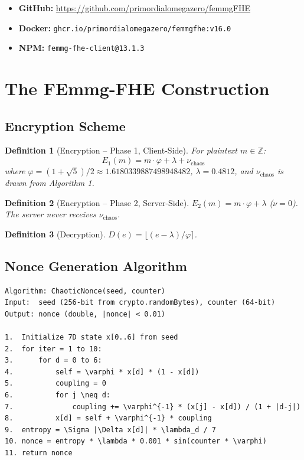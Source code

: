 \documentclass{article}
\newtheorem{definition}{Definition}[section]
\begin{document}
\begin{itemize}
    \item \textbf{GitHub:} \url{https://github.com/primordialomegazero/femmgFHE}
    \item \textbf{Docker:} \texttt{ghcr.io/primordialomegazero/femmgfhe:v16.0}
    \item \textbf{NPM:} \texttt{femmg-fhe-client@13.1.3}
\end{itemize}

\section{The FEmmg-FHE Construction}

\subsection{Encryption Scheme}

\begin{definition}[Encryption -- Phase 1, Client-Side]
For plaintext $m \in \mathbb{Z}$:
\begin{equation}
E_1(m) = m \cdot \varphi + \lambda + \nu_{\text{chaos}}
\end{equation}
where $\varphi = (1+\sqrt{5})/2 \approx 1.6180339887498948482$, $\lambda = 0.4812$, and $\nu_{\text{chaos}}$ is drawn from Algorithm 1.
\end{definition}

\begin{definition}[Encryption -- Phase 2, Server-Side]
$E_2(m) = m \cdot \varphi + \lambda$ ($\nu = 0$). The server never receives $\nu_{\text{chaos}}$.
\end{definition}

\begin{definition}[Decryption]
$D(e) = \lfloor (e - \lambda) / \varphi \rceil$.
\end{definition}

\subsection{Nonce Generation Algorithm}

\begin{lstlisting}[basicstyle=\ttfamily\small, frame=single, label={alg:nonce}]
Algorithm: ChaoticNonce(seed, counter)
Input:  seed (256-bit from crypto.randomBytes), counter (64-bit)
Output: nonce (double, |nonce| < 0.01)

1.  Initialize 7D state x[0..6] from seed
2.  for iter = 1 to 10:
3.      for d = 0 to 6:
4.          self = \varphi * x[d] * (1 - x[d])
5.          coupling = 0
6.          for j \neq d:
7.              coupling += \varphi^{-1} * (x[j] - x[d]) / (1 + |d-j|)
8.          x[d] = self + \varphi^{-1} * coupling
9.  entropy = \Sigma |\Delta x[d]| * \lambda_d / 7
10. nonce = entropy * \lambda * 0.001 * sin(counter * \varphi)
11. return nonce
\end{lstlisting}
\end{document}
